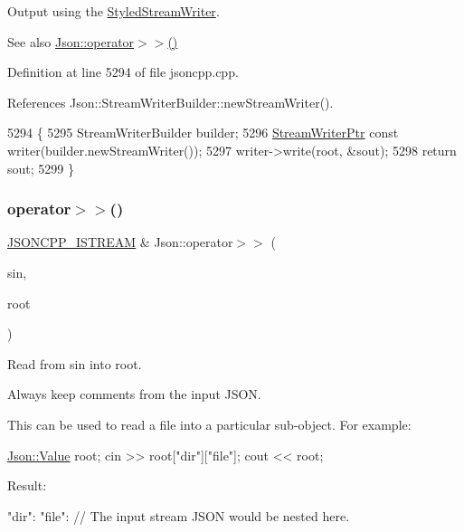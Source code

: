 Output using the \hyperlink{class_json_1_1_styled_stream_writer}{Styled\+Stream\+Writer}. 

\begin{DoxySeeAlso}{See also}
\hyperlink{namespace_json_a244ed0996aba750c40c1641c06bba449}{Json\+::operator$>$$>$()} 
\end{DoxySeeAlso}


Definition at line 5294 of file jsoncpp.\+cpp.



References Json\+::\+Stream\+Writer\+Builder\+::new\+Stream\+Writer().


\begin{DoxyCode}
5294                                                                       \{
5295   StreamWriterBuilder builder;
5296   \hyperlink{namespace_json_a7132404aeebfc96d7c6ad2c66260afb5}{StreamWriterPtr} \textcolor{keyword}{const} writer(builder.newStreamWriter());
5297   writer->write(root, &sout);
5298   \textcolor{keywordflow}{return} sout;
5299 \}
\end{DoxyCode}
\mbox{\label{namespace_json_a244ed0996aba750c40c1641c06bba449}} 
\subsubsection{\texorpdfstring{operator$>$$>$()}{operator>>()}}
{\footnotesize\ttfamily \hyperlink{json_8h_a15f2f70b2ce0a2abd0f8112393dbc4de}{J\+S\+O\+N\+C\+P\+P\+\_\+\+I\+S\+T\+R\+E\+AM} \& Json\+::operator$>$$>$ (\begin{DoxyParamCaption}\item[{\hyperlink{json_8h_a15f2f70b2ce0a2abd0f8112393dbc4de}{J\+S\+O\+N\+C\+P\+P\+\_\+\+I\+S\+T\+R\+E\+AM} \&}]{sin,  }\item[{\hyperlink{class_json_1_1_value}{Value} \&}]{root }\end{DoxyParamCaption})}



Read from \textquotesingle{}sin\textquotesingle{} into \textquotesingle{}root\textquotesingle{}. 

Always keep comments from the input J\+S\+ON.

This can be used to read a file into a particular sub-\/object. For example\+: 
\begin{DoxyCode}
\hyperlink{class_json_1_1_value}{Json::Value} root;
cin >> root[\textcolor{stringliteral}{"dir"}][\textcolor{stringliteral}{"file"}];
cout << root;
\end{DoxyCode}
 Result\+: \begin{DoxyVerb}{
"dir": {
    "file": {
    // The input stream JSON would be nested here.
    }
}
}
\end{DoxyVerb}
 
